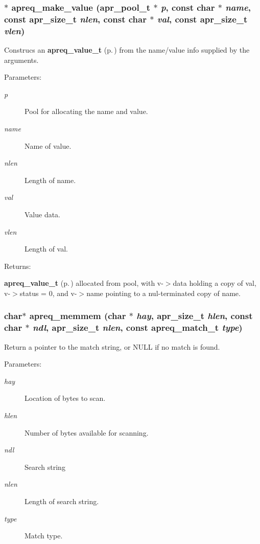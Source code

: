 \subsubsection{$\ast$ apreq\_\-make\_\-value ({\bf apr\_\-pool\_\-t} $\ast$ {\em p}, const char $\ast$ {\em name}, const {\bf apr\_\-size\_\-t} {\em nlen}, const char $\ast$ {\em val}, const {\bf apr\_\-size\_\-t} {\em vlen})}\label{group__Utils_a3}


Construcs an {\bf apreq\_\-value\_\-t} {\rm (p.\,\pageref{structapreq__value__t})} from the name/value info supplied by the arguments.\begin{Desc}
\item[Parameters: ]\par
\begin{description}
\item[{\em 
p}]Pool for allocating the name and value. \item[{\em 
name}]Name of value. \item[{\em 
nlen}]Length of name. \item[{\em 
val}]Value data. \item[{\em 
vlen}]Length of val. \end{description}
\end{Desc}
\begin{Desc}
\item[Returns: ]\par
{\bf apreq\_\-value\_\-t} {\rm (p.\,\pageref{structapreq__value__t})} allocated from pool,  with v-$>$data holding a copy of val, v-$>$status = 0, and v-$>$name pointing to a nul-terminated copy of name. \end{Desc}
\subsubsection{\setlength{\rightskip}{0pt plus 5cm}char$\ast$ apreq\_\-memmem (char $\ast$ {\em hay}, {\bf apr\_\-size\_\-t} {\em hlen}, const char $\ast$ {\em ndl}, {\bf apr\_\-size\_\-t} {\em nlen}, const {\bf apreq\_\-match\_\-t} {\em type})}\label{group__Utils_a8}


Return a pointer to the match string, or NULL if no match is found. \begin{Desc}
\item[Parameters: ]\par
\begin{description}
\item[{\em 
hay}]Location of bytes to scan. \item[{\em 
hlen}]Number of bytes available for scanning. \item[{\em 
ndl}]Search string \item[{\em 
nlen}]Length of search string. \item[{\em 
type}]Match type. \end{description}
\end{Desc}

